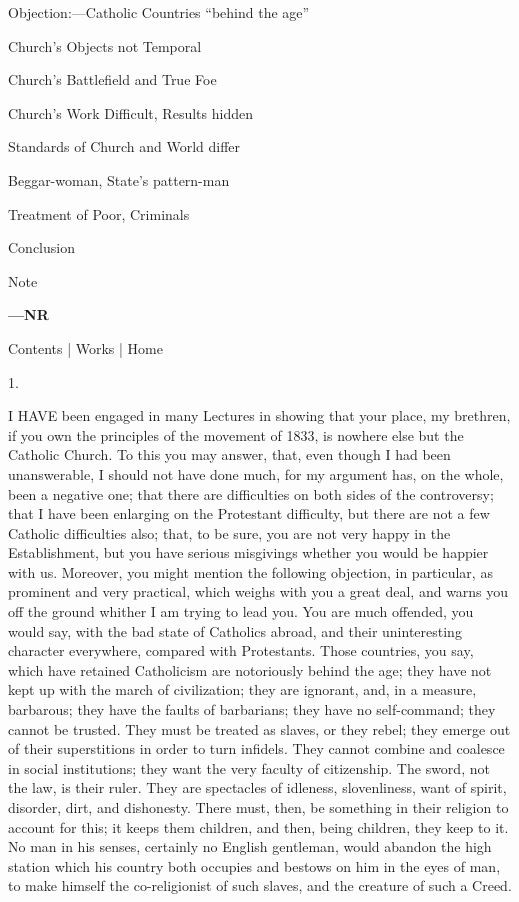 Objection:—Catholic Countries
``behind the age''

Church's Objects not Temporal

Church's Battlefield and True Foe

Church's Work Difficult, Results hidden

Standards of Church and World differ

Beggar-woman, State's pattern-man

Treatment of Poor, Criminals

Conclusion

Note

\textbf{—NR}

Contents | Works
| Home

1.

I HAVE been engaged in many Lectures in showing that your place, my
brethren, if you own the principles of the movement of 1833, is
nowhere else but the Catholic Church. To this you may answer, that,
even though I had been unanswerable, I should not have done much, for\textbf{\emph{
}}my argument has, on the whole, been a negative one; that there
are difficulties on both sides of the controversy; that I have been
enlarging on the Protestant difficulty, but there are not a few
Catholic difficulties also; that, to be sure, you are not very happy
in the Establishment, but you have serious misgivings whether you
would be happier with us. Moreover, you might mention the following
objection, in particular, as prominent and very practical, which
weighs with you a great deal, and warns you off the ground whither I
am trying to lead you. You are much offended, you would say, with the
bad state of Catholics abroad, and their uninteresting character
everywhere, compared with Protestants. Those countries, you say, which
have retained Catholicism are notoriously behind the age; they have
not kept up with the march of civilization; they are ignorant, and, in
a measure, barbarous; they have the faults of barbarians; they have no
self-command; they cannot be trusted. They must be treated as slaves,
or they rebel; they emerge out of their superstitions in order to turn
infidels. They cannot combine and coalesce in social institutions;
they want the very faculty of citizenship. The sword, not the law, is
their ruler. They are spectacles of idleness, slovenliness, want of
spirit, disorder, dirt, and dishonesty. There must, then, be something
in their religion to account for this; it keeps them children, and
then, being children, they keep to it. No man in his senses, certainly
no English gentleman, would abandon the high station which his country
both occupies and bestows on him in the eyes of man, to make himself
the co-religionist of such slaves, and the creature of such a Creed.

